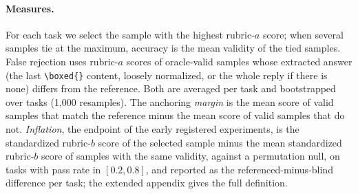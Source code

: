 \paragraph{Measures.}
For each task we select the sample with the highest rubric-$a$ score; when several samples tie at the maximum, accuracy is the mean validity of the tied samples. False rejection uses rubric-$a$ scores of oracle-valid samples whose extracted answer (the last \texttt{\textbackslash boxed\{\}} content, loosely normalized, or the whole reply if there is none) differs from the reference. Both are averaged per task and bootstrapped over tasks (1,000 resamples). The anchoring \emph{margin} is the mean score of valid samples that match the reference minus the mean score of valid samples that do not. \emph{Inflation}, the endpoint of the early registered experiments, is the standardized rubric-$b$ score of the selected sample minus the mean standardized rubric-$b$ score of samples with the same validity, against a permutation null, on tasks with pass rate in $[0.2, 0.8]$, and reported as the referenced-minus-blind difference per task; the extended appendix gives the full definition.

